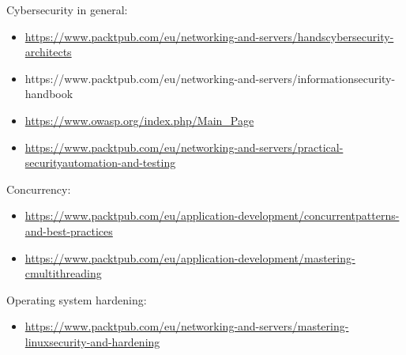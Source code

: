 
Cybersecurity in general:

\begin{itemize}
\item 
\url{https://www.packtpub.com/eu/networking-and-servers/handscybersecurity-architects}

\item 
https://www.packtpub.com/eu/networking-and-servers/informationsecurity-handbook

\item 
\url{https://www.owasp.org/index.php/Main\_Page}

\item 
\url{https://www.packtpub.com/eu/networking-and-servers/practical-securityautomation-and-testing}
\end{itemize}


Concurrency:

\begin{itemize}
\item 
\url{https://www.packtpub.com/eu/application-development/concurrentpatterns-and-best-practices}

\item 
\url{https://www.packtpub.com/eu/application-development/mastering-cmultithreading}
\end{itemize}

Operating system hardening:

\begin{itemize}
\item 
\url{https://www.packtpub.com/eu/networking-and-servers/mastering-linuxsecurity-and-hardening}
\end{itemize}